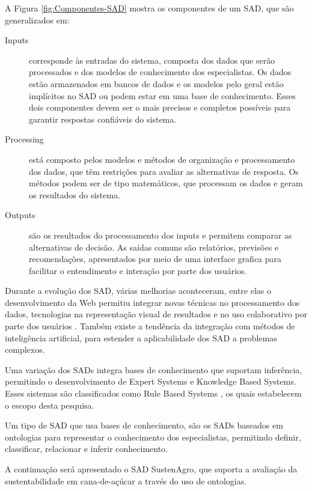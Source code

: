 A Figura \ref{fig:Componentes-SAD} mostra os componentes de um SAD,
que são generalizados em:
\begin{description}
\item [{I\foreignlanguage{english}{nputs}}] corresponde às entradas do
sistema, composta dos dados que serão processados e dos modelos de
conhecimento dos especialistas. Os dados estão armazenados em bancos
de dados e os modelos pelo geral estão implícitos no SAD ou podem
estar em uma base de conhecimento. Esses dois componentes devem ser
o mais precisos e completos possíveis para garantir respostas confiáveis
do sistema.
%
\item [{Processing}] \foreignlanguage{brazil}{está composto pelos modelos
e métodos de organização e processamento dos dados, que têm restrições
para avaliar as alternativas de resposta. Os métodos podem ser de
tipo matemáticos, que processam os dados e geram os resultados do
sistema.}
\item [{Outputs}] \foreignlanguage{brazil}{são os resultados do processamento
dos inputs e permitem comparar as alternativas de decisão. As saídas
comuns são relatórios, previsões e recomendações, apresentados por
meio de uma interface grafica para facilitar o entendimento e interação
por parte dos usuários.}
\end{description}
Durante a evolução dos SAD, várias melhorias aconteceram, entre elas
o desenvolvimento da Web permitiu integrar novas técnicas no processamento
dos dados, tecnologias na representação visual de resultados e no
uso colaborativo por parte dos usuários \citep{Shim2002}. Também
existe a tendência da integração com métodos de inteligência artificial,
para estender a aplicabilidade dos SAD a problemas complexos. 

Uma variação dos SADs integra bases de conhecimento que suportam inferência,
permitindo o desenvolvimento de \foreignlanguage{english}{Expert Systems}
e \foreignlanguage{english}{Knowledge Based Systems.} Esses sistemas
são classificados como \foreignlanguage{english}{Rule Based Systems}
\citep{Tweedale2016}, os quais estabelecem o escopo desta pesquisa. 

Um tipo de SAD que usa bases de conhecimento, são os SADs baseados
em ontologias para representar o conhecimento dos especialistas, permitindo
definir, classificar, relacionar e inferir conhecimento. 

A continuação será apresentado o SAD SustenAgro, que suporta a avaliação
da sustentabilidade em cana-de-açúcar a través do uso de ontologias.


